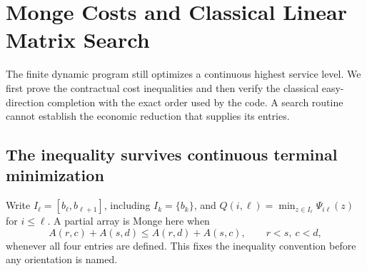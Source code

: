 \section{Monge Costs and Classical Linear Matrix Search}\label{sec:r37-search}
The finite dynamic program still optimizes a continuous highest service level. We first prove the contractual cost inequalities and then verify the classical easy-direction completion with the exact order used by the code. A search routine cannot establish the economic reduction that supplies its entries.

\subsection{The inequality survives continuous terminal minimization}
Write $I_\ell=[b_\ell,b_{\ell+1}]$, including $I_k=\{b_k\}$, and $Q(i,\ell)=\min_{z\in I_\ell}\Psi_{i\ell}(z)$ for $i\leq\ell$. A partial array is Monge here when
\begin{equation}\label{eq:r37-monge}
 A(r,c)+A(s,d)\leq A(r,d)+A(s,c),\qquad r<s,\ c<d,
\end{equation}
whenever all four entries are defined. This fixes the inequality convention before any orientation is named.

